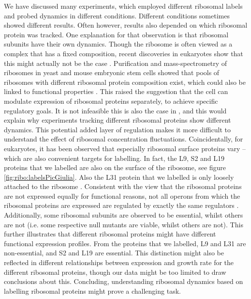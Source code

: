 We have discussed many experiments, which employed different ribosomal labels and probed dynamics in different conditions.
%
Different conditions sometimes showed different results.
%
Often however, results also depended on which ribosomal protein was tracked.
%
One explanation for that observation is that ribosomal subunits have their own dynamics.
%
Though the ribosome is often viewed as a complex that has a fixed composition, 
recent discoveries in eukaryotes show that this might actually not be the case \cite{Preiss2016, Slavov2015}.
%
Purification and mass-spectrometry of ribosomes in yeast and mouse embryonic stem cells showed that 
pools of ribosomes with different ribosomal protein composition exist, which could also be linked to functional properties \cite{Slavov2015}.
%
This raised the suggestion that the cell can modulate expression of ribosomal proteins separately, 
to achieve specific regulatory goals.
%
It is not infeasible this is also the case in \ecoli, and this would explain why experiments tracking different ribosomal proteins show different dynamics.
%
This potential added layer of regulation makes it more difficult to understand the effect of ribosomal concentration fluctuations.
Coincidentally, for eukaryotes, it has been observed that especially ribosomal surface proteins vary -- which are also convenient targets for labelling.
In fact, the L9, S2 and L19 proteins that we  labelled are also on the surface of the ribosome, see figure \ref{fig:ribo:labelsPicGiulia}.
Also the L31 protein that we labelled is only loosely attached to the ribosome \cite{Walker2016t}.
%
Consistent with the view that the ribosomal proteins are not expressed equally for functional reasons, 
not all operons from which the ribosomal proteins are expressed are regulated by exactly the same regulators \cite{Keseler2017}.
%
Additionally, some ribosomal subunits are observed to be essential, whilst others are not (i.e. some respective null mutants are viable, whilst others are not).
This further illustrates that different ribosomal proteins might have different functional expression profiles.
%
From the proteins that we labelled, L9 and L31 are non-essential, and S2 and L19 are essential.
%
This distinction might also be reflected in different relationships between expression and growth rate for the different ribosomal proteins, 
though our data might be too limited to draw conclusions about this.
%
%
Concluding, understanding ribosomal dynamics based on labelling ribosomal proteins might prove a challenging task.

